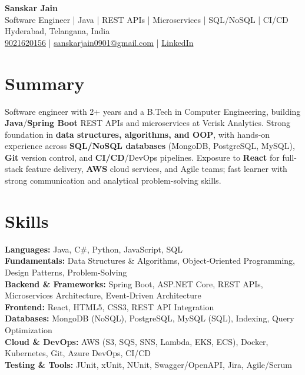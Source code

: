 \documentclass[a4paper,10pt]{article}
\begin{document}
\begin{center}
    {\LARGE \textbf{Sanskar Jain}} \\
    Software Engineer \;|\; Java \;|\; REST APIs \;|\; Microservices \;|\; SQL/NoSQL \;|\; CI/CD \\
    Hyderabad, Telangana, India \\
    \href{tel:9021620156}{9021620156} \;|\;
    \href{mailto:sanskarjain0901@gmail.com}{sanskarjain0901@gmail.com} \;|\;
    \href{https://www.linkedin.com/in/sanskar-jain0901/}{LinkedIn}
\end{center}

\vspace{3pt}

\section*{Summary}
Software engineer with 2+ years and a B.Tech in Computer Engineering, building \textbf{Java}/\textbf{Spring Boot} REST APIs and microservices at Verisk Analytics.
Strong foundation in \textbf{data structures, algorithms, and OOP}, with hands-on experience across \textbf{SQL/NoSQL databases} (MongoDB, PostgreSQL, MySQL), \textbf{Git} version control, and \textbf{CI/CD}/DevOps pipelines.
Exposure to \textbf{React} for full-stack feature delivery, \textbf{AWS} cloud services, and Agile teams; fast learner with strong communication and analytical problem-solving skills.

\section*{Skills}
\textbf{Languages:} Java, C\#, Python, JavaScript, SQL \\
\textbf{Fundamentals:} Data Structures \& Algorithms, Object-Oriented Programming, Design Patterns, Problem-Solving \\
\textbf{Backend \& Frameworks:} Spring Boot, ASP.NET Core, REST APIs, Microservices Architecture, Event-Driven Architecture \\
\textbf{Frontend:} React, HTML5, CSS3, REST API Integration \\
\textbf{Databases:} MongoDB (NoSQL), PostgreSQL, MySQL (SQL), Indexing, Query Optimization \\
\textbf{Cloud \& DevOps:} AWS (S3, SQS, SNS, Lambda, EKS, ECS), Docker, Kubernetes, Git, Azure DevOps, CI/CD \\
\textbf{Testing \& Tools:} JUnit, xUnit, NUnit, Swagger/OpenAPI, Jira, Agile/Scrum
\end{document}

